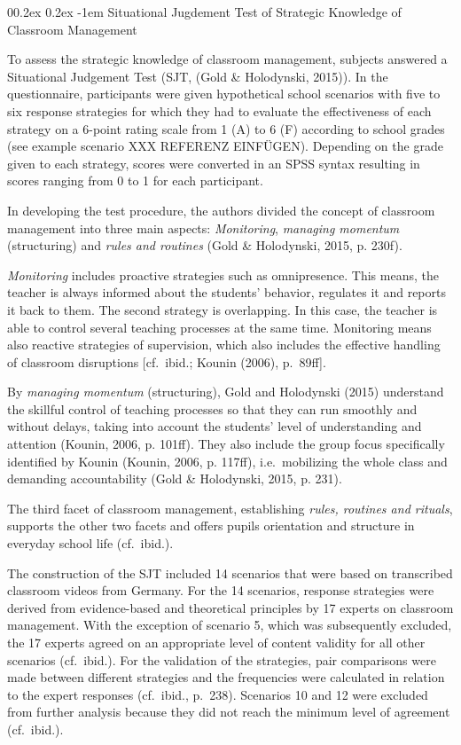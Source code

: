 \documentclass[
  man]{apa6}
\makeatletter
\let\oldparagraph\paragraph
\renewcommand{\paragraph}[1]{\oldparagraph{#1}\mbox{}}
\renewcommand{\paragraph}{\@startsection{paragraph}{4}{\parindent}%
  {0\baselineskip \@plus 0.2ex \@minus 0.2ex}%
  {-1em}%
  {\normalfont\normalsize\bfseries\itshape\typesectitle}}
\makeatother
\begin{document}
\paragraph{Situational Jugdement Test of Strategic Knowledge of Classroom Management}\label{situational-jugdement-test-of-strategic-knowledge-of-classroom-management}

To assess the strategic knowledge of classroom management, subjects answered a Situational Judgement Test (SJT, (Gold \& Holodynski, 2015)). In the questionnaire, participants were given hypothetical school scenarios with five to six response strategies for which they had to evaluate the effectiveness of each strategy on a 6-point rating scale from 1 (A) to 6 (F) according to school grades (see example scenario XXX REFERENZ EINFÜGEN). Depending on the grade given to each strategy, scores were converted in an SPSS syntax resulting in scores ranging from 0 to 1 for each participant.

In developing the test procedure, the authors divided the concept of classroom management into three main aspects: \emph{Monitoring}, \emph{managing momentum} (structuring) and \emph{rules and routines} (Gold \& Holodynski, 2015, p. 230f).

\emph{Monitoring} includes proactive strategies such as omnipresence. This means, the teacher is always informed about the students' behavior, regulates it and reports it back to them. The second strategy is overlapping. In this case, the teacher is able to control several teaching processes at the same time. Monitoring means also reactive strategies of supervision, which also includes the effective handling of classroom disruptions {[}cf.~ibid.; Kounin (2006), p.~89ff{]}.

By \emph{managing momentum} (structuring), Gold and Holodynski (2015) understand the skillful control of teaching processes so that they can run smoothly and without delays, taking into account the students' level of understanding and attention (Kounin, 2006, p. 101ff). They also include the group focus specifically identified by Kounin (Kounin, 2006, p. 117ff), i.e.~mobilizing the whole class and demanding accountability (Gold \& Holodynski, 2015, p. 231).

The third facet of classroom management, establishing \emph{rules, routines and rituals}, supports the other two facets and offers pupils orientation and structure in everyday school life (cf.~ibid.).

The construction of the SJT included 14 scenarios that were based on transcribed classroom videos from Germany. For the 14 scenarios, response strategies were derived from evidence-based and theoretical principles by 17 experts on classroom management. With the exception of scenario 5, which was subsequently excluded, the 17 experts agreed on an appropriate level of content validity for all other scenarios (cf.~ibid.). For the validation of the strategies, pair comparisons were made between different strategies and the frequencies were calculated in relation to the expert responses (cf.~ibid., p.~238). Scenarios 10 and 12 were excluded from further analysis because they did not reach the minimum level of agreement (cf.~ibid.).
\end{document}
